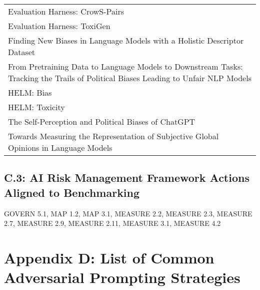 \documentclass[fleqn]{article}
\begin{document}
\begin{table}[H]
\begin{tabular}{l}
		Evaluation Harness: CrowS-Pairs  \\
		Evaluation Harness: ToxiGen \\
		Finding New Biases in Language Models with a Holistic Descriptor Dataset \\
		\makecell[l]{From Pretraining Data to Language Models to Downstream Tasks:\\\hspace{10pt} Tracking the Trails of Political Biases Leading to Unfair NLP Models} \\
		HELM: Bias \\
		HELM: Toxicity \\
		The Self-Perception and Political Biases of ChatGPT \\
		Towards Measuring the Representation of Subjective Global Opinions in Language Models\\
		\bottomrule			
	\end{tabular}
\end{table}

\subsection*{C.3: AI Risk Management Framework Actions Aligned to Benchmarking}\label{appndxc3}

GOVERN 5.1, MAP 1.2, MAP 3.1, MEASURE 2.2, MEASURE 2.3, MEASURE 2.7, MEASURE 2.9, MEASURE 2.11, MEASURE 3.1, MEASURE 4.2

\section*{Appendix D: List of Common Adversarial Prompting Strategies}

 
\end{document}
